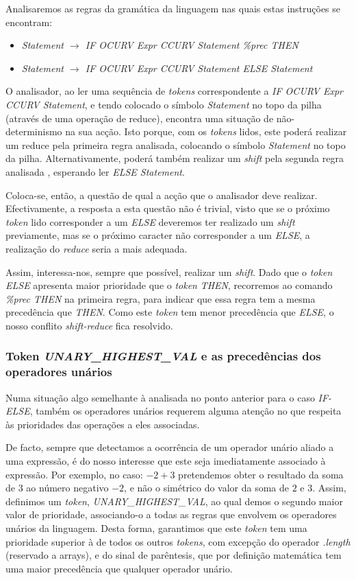 \documentclass[11pt,a4paper]{article}
\begin{document}
Analisaremos as regras da gramática da linguagem nas quais estas instruções se encontram:
\begin{itemize}
\item \emph{Statement $\rightarrow$ IF OCURV Expr CCURV Statement \%prec THEN}

\item \emph{Statement $\rightarrow$ IF OCURV Expr CCURV Statement ELSE Statement}
\end{itemize}

O analisador, ao ler uma sequência de \emph{tokens} correspondente a \emph{IF OCURV Expr CCURV Statement}, e tendo colocado o símbolo \emph{Statement} no topo da pilha (através de uma operação de reduce), encontra uma situação de não-determinismo na sua acção. Isto porque, com os \emph{tokens} lidos, este poderá realizar um reduce pela primeira regra analisada, colocando o símbolo \emph{Statement} no topo da pilha. Alternativamente, poderá também realizar um \emph{shift} pela segunda regra analisada , esperando ler \emph{ELSE Statement}.

Coloca-se, então, a questão de qual a acção que o analisador deve realizar. Efectivamente, a resposta a esta questão não é trivial, visto que se o próximo \emph{token} lido corresponder a um \emph{ELSE} deveremos ter realizado um \emph{shift} previamente, mas se o próximo caracter não corresponder a um \emph{ELSE}, a realização do \emph{reduce} seria a mais adequada.

Assim, interessa-nos, sempre que possível, realizar um \emph{shift}. Dado que o \emph{token} \emph{ELSE} apresenta maior prioridade que o \emph{token} \emph{THEN}, recorremos ao comando \emph{\%prec THEN} na primeira regra, para indicar que essa regra tem a mesma precedência que \emph{THEN}. Como este \emph{token} tem menor precedência que \emph{ELSE}, o nosso conflito \emph{shift-reduce} fica resolvido.

\subsubsection{Token \emph{UNARY\_HIGHEST\_VAL} e as precedências dos operadores unários}

Numa situação algo semelhante à analisada no ponto anterior para o caso \emph{IF-ELSE}, também os operadores unários requerem alguma atenção no que respeita às prioridades das operações a eles associadas.

De facto, sempre que detectamos a ocorrência de um operador unário aliado a uma expressão, é do nosso interesse que este seja imediatamente associado à expressão. Por exemplo, no caso: $-2+3$ pretendemos obter o resultado da soma de $3$ ao número negativo $-2$, e não o simétrico do valor da soma de $2$ e $3$. Assim, definimos um \emph{token}, \emph{UNARY\_HIGHEST\_VAL}, ao qual demos o segundo maior valor de prioridade, associando-o a todas as regras que envolvem os operadores unários da linguagem. Desta forma, garantimos que este \emph{token} tem uma prioridade superior à de todos os outros \emph{tokens}, com excepção do operador \emph{.length} (reservado a arrays), e do sinal de parêntesis, que por definição matemática tem uma maior precedência que qualquer operador unário.
\end{document}
